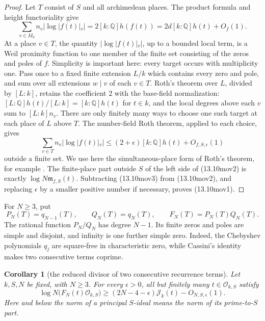 \documentclass[11pt,reqno]{amsart}
\newtheorem{corollary}[theorem]{Corollary}
\theoremstyle{definition}
\theoremstyle{remark}
\newcommand{\Q}{\mathbb Q}
\newcommand{\cO}{\mathcal O}
\begin{document}
\begin{proof}
Let \(T\) consist of \(S\) and all archimedean places.  The product formula
and height functoriality give
\[
 \sum_{v\in M_k}n_v|\log|f(t)|_v|
 =2[k:\Q]h(f(t))
 =2d[k:\Q]h(t)+O_f(1).
\tag{13.10mov2}
\]
At a place \(v\in T\), the quantity
\(|\log|f(t)|_v|\), up to a bounded local term, is a Weil proximity
function to one member of the finite set consisting of the zeros and poles
of \(f\).  Simplicity is important here: every target occurs with
multiplicity one.  Pass once to a fixed finite extension \(L/k\) which
contains every zero and pole, and sum over all extensions \(w\mid v\) of
each \(v\in T\).  Roth's theorem over \(L\), divided by \([L:k]\),
retains the coefficient \(2\) with the base-field normalization:
\([L:\Q]h(t)/[L:k]=[k:\Q]h(t)\) for \(t\in k\), and the local degrees
above each \(v\) sum to \([L:k]n_v\).  There are only finitely many ways to choose one such
target at each place of \(L\) above \(T\).  The number-field Roth theorem, applied to
each choice, gives
\[
 \sum_{v\in T}n_v|\log|f(t)|_v|
 \le (2+\epsilon)[k:\Q]h(t)+O_{f,S,\epsilon}(1)
\tag{13.10mov3}
\]
outside a finite set.  We use here the simultaneous-place form of Roth's
theorem, for example \cite[Theorem~6.4.1]{BombieriGubler}.  The finite-place
part outside \(S\) of the left side of (13.10mov2) is exactly
\(\log N\mathfrak m_{f,S}(t)\).  Subtracting (13.10mov3) from
(13.10mov2), and replacing \(\epsilon\) by a smaller positive number if
necessary, proves (13.10mov1).
\end{proof}

For \(N\ge3\), put
\[
 P_N(T)=q_{N-1}(T),\qquad Q_N(T)=q_N(T),\qquad
 F_N(T)=P_N(T)Q_N(T).
\]
The rational function \(P_N/Q_N\) has degree \(N-1\).  Its finite zeros
and poles are simple and disjoint, and infinity is one further simple zero.
Indeed, the Chebyshev polynomials \(q_j\) are square-free in characteristic
zero, while Cassini's identity makes two consecutive terms coprime.

\begin{corollary}[the reduced divisor of two consecutive recurrence terms]
\label{cor:roth-chebyshev-pair}
Let \(k,S,N\) be fixed, with \(N\ge3\).  For every
\(\epsilon>0\), all but finitely many \(t\in\cO_{k,S}\) satisfy
\[
 \log N\bigl(F_N(t)\cO_{k,S}\bigr)
 \ge(2N-4-\epsilon)\mathcal J_k(t)-O_{N,S,\epsilon}(1).
\tag{13.10mov4}
\]
Here and below the norm of a principal \(S\)-ideal means the norm of its
prime-to-\(S\) part.
\end{corollary}
\end{document}
